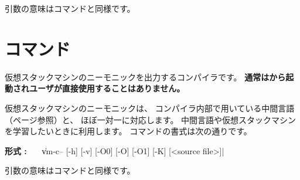 引数の意味は{\cmmc}コマンドと同様です。

\section{{\vcmmc}コマンド}
\label{command:vcmmc}

仮想スタックマシンのニーモニックを出力する{\cmm}コンパイラです。
{\bf 通常は{\cmv}から起動されユーザが直接使用することはありません。}

仮想スタックマシンのニーモニックは、
コンパイラ内部で用いている中間言語（\pageref{app:vm}ページ参照）と、
ほぼ一対一に対応します。
中間言語や仮想スタックマシンを学習したいときに利用します。
{\vcmmc}コマンドの書式は次の通りです。

\begin{flushleft}
{\bf 形式 : }~~~\|vm-c-- [-h] [-v] [-O0] [-O] [-O1] [-K] [<source file>]|
\end{flushleft}

引数の意味は{\cmmc}コマンドと同様です。
%

